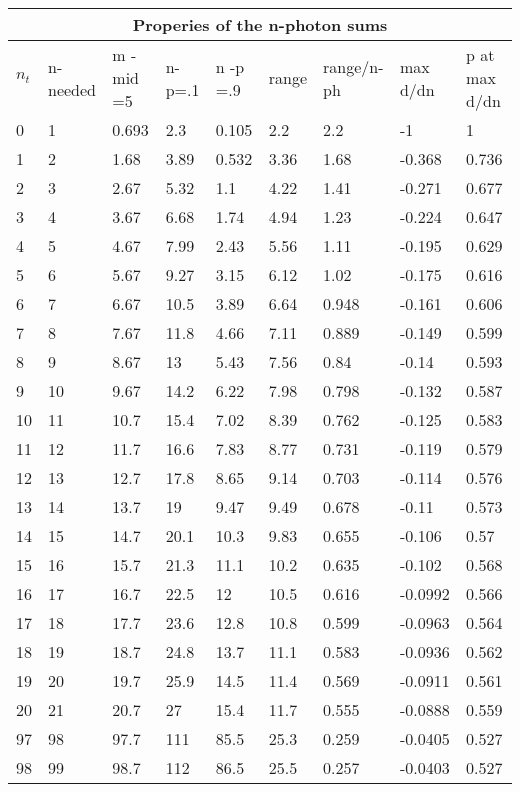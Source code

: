  \ifdefined\mjmstandalone%
%
\else%
\newcommand{\mjmstandalone}[1]{%
  \ifdefined\MJMTEXFRAG%
   #1%
  \fi%
}
  \fi%


\begin{table}[H] \centering
\begin{tabular}{l|l|l|l|l|l|l|l|l|}
\hline
\multicolumn{9}{c}{Properies of the n-photon sums}\\
\hline
$n_t$&n-needed &m - mid =5&n-p=.1&n -p =.9&range&range/n-ph&max d/dn&p at max d/dn \\
\hline
0&1&0.693&2.3&0.105&2.2&2.2&-1&1 \\
1&2&1.68&3.89&0.532&3.36&1.68&-0.368&0.736 \\
2&3&2.67&5.32&1.1&4.22&1.41&-0.271&0.677 \\
3&4&3.67&6.68&1.74&4.94&1.23&-0.224&0.647 \\
4&5&4.67&7.99&2.43&5.56&1.11&-0.195&0.629 \\
5&6&5.67&9.27&3.15&6.12&1.02&-0.175&0.616 \\
6&7&6.67&10.5&3.89&6.64&0.948&-0.161&0.606 \\
7&8&7.67&11.8&4.66&7.11&0.889&-0.149&0.599 \\
8&9&8.67&13&5.43&7.56&0.84&-0.14&0.593 \\
9&10&9.67&14.2&6.22&7.98&0.798&-0.132&0.587 \\
10&11&10.7&15.4&7.02&8.39&0.762&-0.125&0.583 \\
11&12&11.7&16.6&7.83&8.77&0.731&-0.119&0.579 \\
12&13&12.7&17.8&8.65&9.14&0.703&-0.114&0.576 \\
13&14&13.7&19&9.47&9.49&0.678&-0.11&0.573 \\
14&15&14.7&20.1&10.3&9.83&0.655&-0.106&0.57 \\
15&16&15.7&21.3&11.1&10.2&0.635&-0.102&0.568 \\
16&17&16.7&22.5&12&10.5&0.616&-0.0992&0.566 \\
17&18&17.7&23.6&12.8&10.8&0.599&-0.0963&0.564 \\
18&19&18.7&24.8&13.7&11.1&0.583&-0.0936&0.562 \\
19&20&19.7&25.9&14.5&11.4&0.569&-0.0911&0.561 \\
20&21&20.7&27&15.4&11.7&0.555&-0.0888&0.559 \\
\hline
97&98&97.7&111&85.5&25.3&0.259&-0.0405&0.527 \\
98&99&98.7&112&86.5&25.5&0.257&-0.0403&0.527 \\

\end{tabular}
\end{table}
